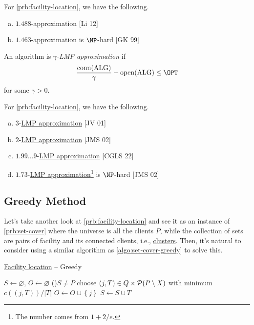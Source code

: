 \begin{remark}[Hardness]
	For \autoref{prb:facility-location}, we have the following.
	\begin{enumerate}[(a)]
		\item \(1.488\)-approximation [Li 12]
		\item \(1.463\)-approximation is \(\NP\)-hard [GK 99]
	\end{enumerate}
\end{remark}

\begin{definition}\label{def:LMP}
	An algorithm is \emph{\(\gamma \)-LMP approximation} if
	\[
		\frac{\mathop{\mathrm{conn}}(\text{ALG})}{\gamma }+ \mathop{\mathrm{open}}(\text{ALG} ) \leq \OPT
	\]
	for some \(\gamma > 0\).
\end{definition}

\begin{remark}
	For \autoref{prb:facility-location}, we have the following.
	\begin{enumerate}[(a)]
		\item \(3\)-\hyperref[def:LMP]{LMP approximation} [JV 01]
		\item \(2\)-\hyperref[def:LMP]{LMP approximation} [JMS 02]
		\item \(1.99\ldots 9 \)-\hyperref[def:LMP]{LMP approximation} [CGLS 22]
		\item \(1.73\)-\hyperref[def:LMP]{LMP approximation}\footnote{The number comes from \(1 + 2 / e\).} is \(\NP\)-hard [JMS 02]
	\end{enumerate}
\end{remark}

\subsection{Greedy Method}
Let's take another look at \autoref{prb:facility-location} and see it as an instance of \autoref{prb:set-cover} where the universe is all the clients \(P\), while the collection of sets are pairs of facility and its connected clients, i.e., \hyperref[def:cluster]{clusters}. Then, it's natural to consider using a similar algorithm as \autoref{algo:set-cover-greedy} to solve this.

\begin{algorithm}[H]\label{algo:facility-location-greedy}
	\DontPrintSemicolon
	\caption{\hyperref[prb:facility-location]{Facility location} -- Greedy}
	\BlankLine

	\(S \gets \varnothing \), \(O\gets \varnothing\)\;
	\While(){\(S \neq P \)}{
		choose \((j, T)\in Q \times \mathcal{\MakeUppercase{p}} (P\setminus X)\) with minimum \(c((j, T)) / \left\vert T \right\vert \)\;
		\(O\gets O \cup \left\{ j \right\}\)\;
		\(S \gets S \cup T\)\;
	}
	\;
\end{algorithm}

